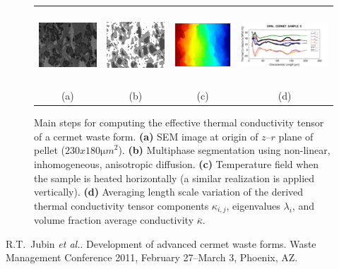 \begin{figure}
\centering
\begin{tabular}{cccc}
\includegraphics[height=1.1in]{./almeida/cermet-SEM.png} &
\includegraphics[height=1.1in]{./almeida/cermet-phases.png} &
\includegraphics[height=1.1in]{./almeida/cermet-xtfield.png} &
\includegraphics[height=1.1in]{./almeida/cermet-ktensor.png}
\\
(a) & (b) & (c) & (d)
\end{tabular}

\caption[Anisotropic thermal conductivity of cermet nuclear waste]{Main steps for computing the effective thermal conductivity tensor of a cermet waste form. \textbf{(a)} SEM image at origin of $z$--$r$ plane of pellet (${230x180\mathrm{\mu}m}^{2}$). \textbf{(b)} Multiphase segmentation using non-linear, inhomogeneous, anisotropic diffusion. \textbf{(c)} Temperature field when the sample is heated horizontally (a similar realization is applied vertically). \textbf{(d)} Averaging length scale variation of the derived thermal conductivity tensor components $\kappa_{i,j}$, eigenvalues $\lambda_i$, and volume fraction average conductivity $\overline{\kappa}$.}
\end{figure}


\begin{thebibliography}{10}
{\sc R.T.~Jubin \emph{et al.}}. {Development of advanced cermet waste forms}. Waste Management Conference 2011, February 27--March 3, Phoenix, AZ.
\end{thebibliography}